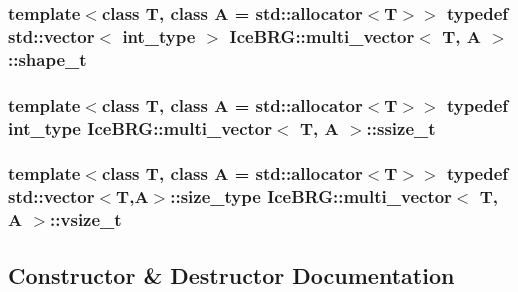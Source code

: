 \subsubsection[{shape\+\_\+t}]{\setlength{\rightskip}{0pt plus 5cm}template$<$class T, class A = std\+::allocator$<$\+T$>$$>$ typedef std\+::vector$<$ {\bf int\+\_\+type} $>$ {\bf Ice\+B\+R\+G\+::multi\+\_\+vector}$<$ T, A $>$\+::{\bf shape\+\_\+t}}\label{classIceBRG_1_1multi__vector_a468a7f934274e7aa75e01c94ac58f3ea}
\hypertarget{classIceBRG_1_1multi__vector_a9ad43f84f33367955b45ca260ea5882b}{}
\subsubsection[{ssize\+\_\+t}]{\setlength{\rightskip}{0pt plus 5cm}template$<$class T, class A = std\+::allocator$<$\+T$>$$>$ typedef {\bf int\+\_\+type} {\bf Ice\+B\+R\+G\+::multi\+\_\+vector}$<$ T, A $>$\+::{\bf ssize\+\_\+t}}\label{classIceBRG_1_1multi__vector_a9ad43f84f33367955b45ca260ea5882b}
\hypertarget{classIceBRG_1_1multi__vector_abcc3d84f2afbb3e4239cea8c2c4923c3}{}
\subsubsection[{vsize\+\_\+t}]{\setlength{\rightskip}{0pt plus 5cm}template$<$class T, class A = std\+::allocator$<$\+T$>$$>$ typedef std\+::vector$<$T,A$>$\+::{\bf size\+\_\+type} {\bf Ice\+B\+R\+G\+::multi\+\_\+vector}$<$ T, A $>$\+::{\bf vsize\+\_\+t}}\label{classIceBRG_1_1multi__vector_abcc3d84f2afbb3e4239cea8c2c4923c3}


\subsection{Constructor \& Destructor Documentation}
\hypertarget{classIceBRG_1_1multi__vector_a6ba7614c52e0dc623fc190d868f8b6ed}{}
